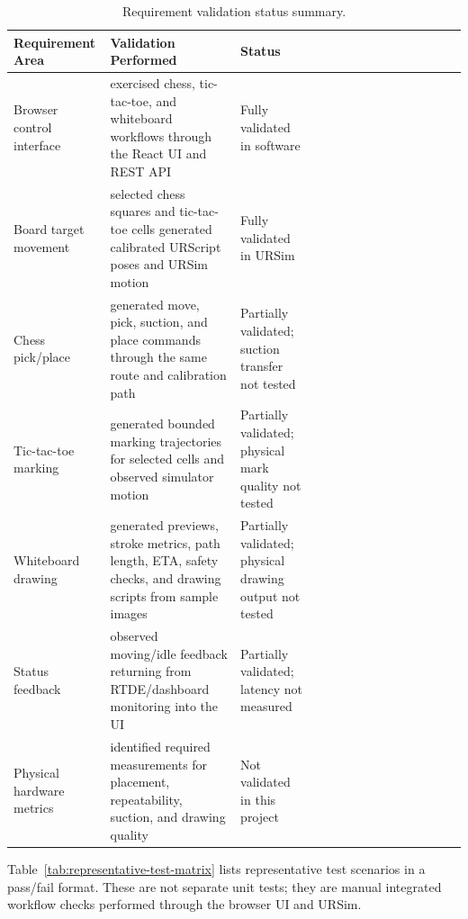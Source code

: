 \documentclass[12pt]{article}
\newcommand{\tablegridon}{\arrayrulecolor{black!35}}
\newcommand{\tablegridoff}{\arrayrulecolor{black}}
\newcommand{\tabrowsep}{\\[0.12em]\hline}
\begin{document}
\begin{table}[H]
\centering
\caption{Requirement validation status summary.}
\label{tab:req-validation-status}
\small
\tablegridon
\begin{tabularx}{\textwidth}{|L{3.2cm}|Y|L{3.0cm}|}
\toprule
Requirement Area & Validation Performed & Status \\
\midrule
Browser control interface & exercised chess, tic-tac-toe, and whiteboard workflows through the React UI and REST API & Fully validated in software \tabrowsep
Board target movement & selected chess squares and tic-tac-toe cells generated calibrated URScript poses and URSim motion & Fully validated in URSim \tabrowsep
Chess pick/place & generated move, pick, suction, and place commands through the same route and calibration path & Partially validated; suction transfer not tested \tabrowsep
Tic-tac-toe marking & generated bounded marking trajectories for selected cells and observed simulator motion & Partially validated; physical mark quality not tested \tabrowsep
Whiteboard drawing & generated previews, stroke metrics, path length, ETA, safety checks, and drawing scripts from sample images & Partially validated; physical drawing output not tested \tabrowsep
Status feedback & observed moving/idle feedback returning from RTDE/dashboard monitoring into the UI & Partially validated; latency not measured \tabrowsep
Physical hardware metrics & identified required measurements for placement, repeatability, suction, and drawing quality & Not validated in this project \\
\bottomrule
\end{tabularx}
\tablegridoff
\end{table}

\vspace{0.5 em}

Table~\ref{tab:representative-test-matrix} lists representative test scenarios in a pass/fail format. These are not separate unit tests; they are manual integrated workflow checks performed through the browser UI and URSim.
\end{document}
